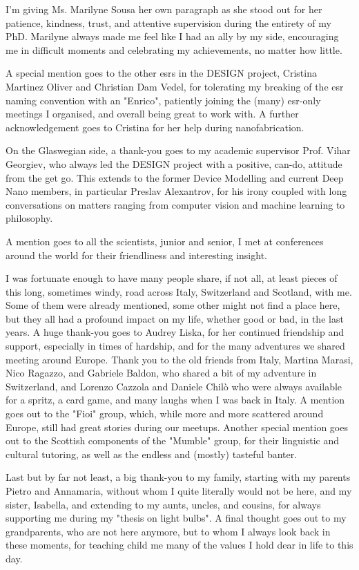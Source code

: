 I'm giving Ms. Marilyne Sousa her own paragraph as she stood out for her patience, kindness, trust, and attentive supervision during the entirety of my PhD. Marilyne always made me feel like I had an ally by my side, encouraging me in difficult moments and celebrating my achievements, no matter how little.

A special mention goes to the other \acs{esr}s in the \acs{DESIGN} project, Cristina Martinez Oliver and Christian Dam Vedel, for tolerating my breaking of the \acs{esr} naming convention with an "Enrico", patiently joining the (many) \acs{esr}-only meetings I organised, and overall being great to work with. A further acknowledgement goes to Cristina for her help during nanofabrication.

On the Glaswegian side, a thank-you goes to my academic supervisor Prof. Vihar Georgiev, who always led the \acs{DESIGN} project with a positive, can-do, attitude from the get go. This extends to the former Device Modelling and current Deep Nano members, in particular Preslav Alexantrov, for his irony coupled with long conversations on matters ranging from computer vision and machine learning to philosophy.

A mention goes to all the scientists, junior and senior, I met at conferences around the world for their friendliness and interesting insight.

I was fortunate enough to have many people share, if not all, at least pieces of this long, sometimes windy, road across Italy, Switzerland and Scotland, with me. Some of them were already mentioned, some other might not find a place here, but they all had a profound impact on my life, whether good or bad, in the last years. A huge thank-you goes to Audrey Liska, for her continued friendship and support, especially in times of hardship, and for the many adventures we shared meeting around Europe. Thank you to the old friends from Italy, Martina Marasi, Nico Ragazzo, and Gabriele Baldon, who shared a bit of my adventure in Switzerland, and Lorenzo Cazzola and Daniele Chilò who were always available for a spritz, a card game, and many laughs when I was back in Italy. A mention goes out to the "Fioi" group, which, while more and more scattered around Europe, still had great stories during our meetups. Another special mention goes out to the Scottish components of the "Mumble" group, for their linguistic and cultural tutoring, as well as the endless and (mostly) tasteful banter.

Last but by far not least, a big thank-you to my family, starting with my parents Pietro and Annamaria, without whom I quite literally would not be here, and my sister, Isabella, and extending to my aunts, uncles, and cousins, for always supporting me during my "thesis on light bulbs". A final thought goes out to my grandparents, who are not here anymore, but to whom I always look back in these moments, for teaching child me many of the values I hold dear in life to this day.
